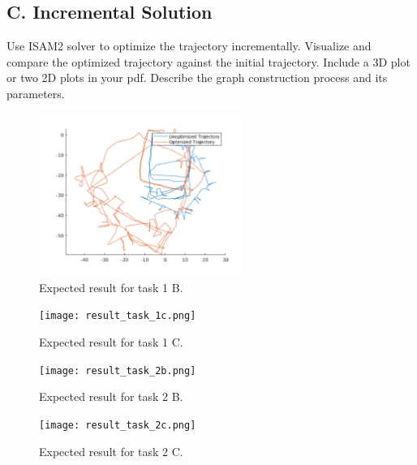 \documentclass[tp]{lcc}
\begin{document}
\subsection{C. Incremental Solution}
Use ISAM2 solver to optimize the trajectory incrementally. Visualize and compare the optimized trajectory against the initial trajectory. Include a 3D plot or two 2D plots in your pdf. Describe the graph construction process and its parameters.

\begin{figure}[!htbp]
    \centering
    \includegraphics[width=0.6\textwidth]{images/result_task_1b.png}
    \caption{Expected result for task 1 B.}
    \label{fig:task1b}
\end{figure}

\begin{figure}[!htbp]
    \centering
    \texttt{[image: result\_task\_1c.png]}
    \caption{Expected result for task 1 C.}
    \label{fig:task1c}
\end{figure}

\begin{figure}[!htbp]
    \centering
    \texttt{[image: result\_task\_2b.png]}
    \caption{Expected result for task 2 B.}
    \label{fig:task2b}
\end{figure}

\begin{figure}[!htbp]
    \centering
    \texttt{[image: result\_task\_2c.png]}
    \caption{Expected result for task 2 C.}
    \label{fig:task2c}
\end{figure}
\end{document}

